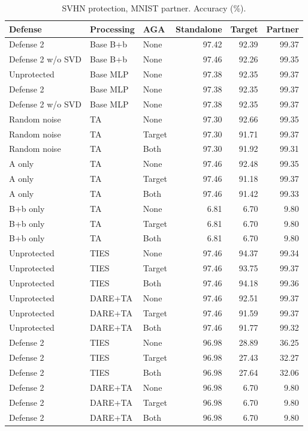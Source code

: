 \begin{table}[t]
\centering\small
\caption{SVHN protection, MNIST partner. Accuracy (\%).}
\begin{tabular}{lllrrr}
\toprule
Defense & Processing & AGA & Standalone & Target & Partner \\
\midrule
Defense 2 & Base B+b & None & 97.42 & 92.39 & 99.37 \\
Defense 2 w/o SVD & Base B+b & None & 97.46 & 92.26 & 99.35 \\
Unprotected & Base MLP & None & 97.38 & 92.35 & 99.37 \\
Defense 2 & Base MLP & None & 97.38 & 92.35 & 99.37 \\
Defense 2 w/o SVD & Base MLP & None & 97.38 & 92.35 & 99.37 \\
Random noise & TA & None & 97.30 & 92.66 & 99.35 \\
Random noise & TA & Target & 97.30 & 91.71 & 99.37 \\
Random noise & TA & Both & 97.30 & 91.92 & 99.31 \\
A only & TA & None & 97.46 & 92.48 & 99.35 \\
A only & TA & Target & 97.46 & 91.18 & 99.37 \\
A only & TA & Both & 97.46 & 91.42 & 99.33 \\
B+b only & TA & None & 6.81 & 6.70 & 9.80 \\
B+b only & TA & Target & 6.81 & 6.70 & 9.80 \\
B+b only & TA & Both & 6.81 & 6.70 & 9.80 \\
Unprotected & TIES & None & 97.46 & 94.37 & 99.34 \\
Unprotected & TIES & Target & 97.46 & 93.75 & 99.37 \\
Unprotected & TIES & Both & 97.46 & 94.18 & 99.36 \\
Unprotected & DARE+TA & None & 97.46 & 92.51 & 99.37 \\
Unprotected & DARE+TA & Target & 97.46 & 91.59 & 99.37 \\
Unprotected & DARE+TA & Both & 97.46 & 91.77 & 99.32 \\
Defense 2 & TIES & None & 96.98 & 28.89 & 36.25 \\
Defense 2 & TIES & Target & 96.98 & 27.43 & 32.27 \\
Defense 2 & TIES & Both & 96.98 & 27.64 & 32.06 \\
Defense 2 & DARE+TA & None & 96.98 & 6.70 & 9.80 \\
Defense 2 & DARE+TA & Target & 96.98 & 6.70 & 9.80 \\
Defense 2 & DARE+TA & Both & 96.98 & 6.70 & 9.80 \\
\bottomrule
\end{tabular}
\end{table}


